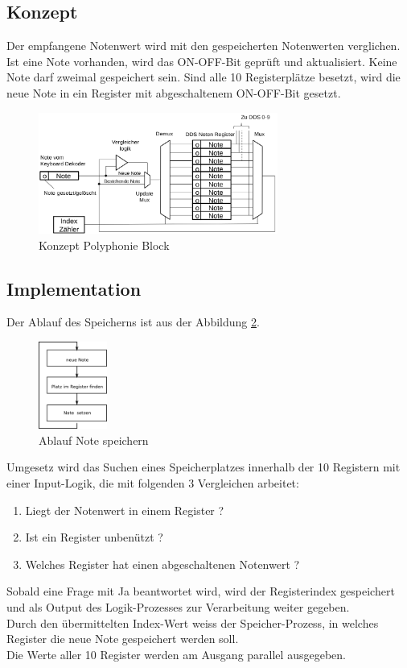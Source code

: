 \subsection{Konzept}\label{konzept_plyphonie}
Der empfangene Notenwert wird mit den gespeicherten Notenwerten verglichen. Ist eine Note vorhanden, wird das ON-OFF-Bit geprüft und aktualisiert. Keine Note darf zweimal gespeichert sein. Sind alle 10 Registerplätze besetzt, wird die neue Note in ein Register mit abgeschaltenem ON-OFF-Bit gesetzt.\\
\begin{figure}[H]
	\centering
	\includegraphics[width=0.7\textwidth]{images/midi_interface/Konzept_Hans_polyphonie.png}
	\caption{Konzept Polyphonie Block \cite{konzept_poly} }
	\label{fig.polyphnie_konzept}
\end{figure}

\subsection{Implementation}
Der Ablauf des Speicherns ist aus der Abbildung \ref{fig.polyphnie_ablauf}.
\begin{figure}[H]
	\centering
	\includegraphics[width=0.2\textwidth]{images/midi_interface/polyphnie_ablauf.png}
	\caption{Ablauf Note speichern }
	\label{fig.polyphnie_ablauf}
\end{figure}

Umgesetz wird das Suchen eines Speicherplatzes innerhalb der 10 Registern mit einer Input-Logik, die mit folgenden 3 Vergleichen arbeitet:
\begin{enumerate}
	\item Liegt der Notenwert in einem Register ? 
	\item Ist ein Register unbenützt ?
	\item Welches Register hat einen abgeschaltenen Notenwert ?
\end{enumerate}
Sobald eine Frage mit Ja beantwortet wird, wird der Registerindex gespeichert und als Output des Logik-Prozesses zur Verarbeitung weiter gegeben.\\
\newline
Durch den übermittelten Index-Wert weiss der Speicher-Prozess, in welches Register die neue Note gespeichert werden soll.\\
Die Werte aller 10 Register werden am Ausgang parallel ausgegeben.



